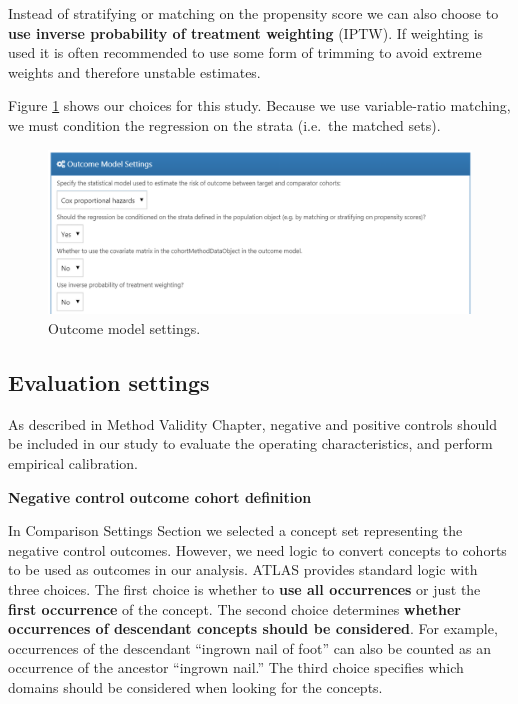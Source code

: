 \documentclass[]{book}
\begin{document}
Instead of stratifying or matching on the propensity score we can also choose to \textbf{use inverse probability of treatment weighting} (IPTW). If weighting is used it is often recommended to use some form of trimming to avoid extreme weights and therefore unstable estimates.

Figure \ref{fig:outcomeModelSettings} shows our choices for this study. Because we use variable-ratio matching, we must condition the regression on the strata (i.e.~the matched sets).

\begin{figure}

{\centering \includegraphics[width=1\linewidth]{images/PopulationLevelEstimation/outcomeModelSettings} 

}

\caption{Outcome model settings.}\label{fig:outcomeModelSettings}
\end{figure}

\hypertarget{evaluationSettings}{%
\subsection{Evaluation settings}\label{evaluationSettings}}

As described in Method Validity Chapter, negative and positive controls should be included in our study to evaluate the operating characteristics, and perform empirical calibration.

\textbf{Negative control outcome cohort definition}

In Comparison Settings Section we selected a concept set representing the negative control outcomes. However, we need logic to convert concepts to cohorts to be used as outcomes in our analysis. ATLAS provides standard logic with three choices. The first choice is whether to \textbf{use all occurrences} or just the \textbf{first occurrence} of the concept. The second choice determines \textbf{whether occurrences of descendant concepts should be considered}. For example, occurrences of the descendant ``ingrown nail of foot'' can also be counted as an occurrence of the ancestor ``ingrown nail.'' The third choice specifies which domains should be considered when looking for the concepts.
\end{document}
